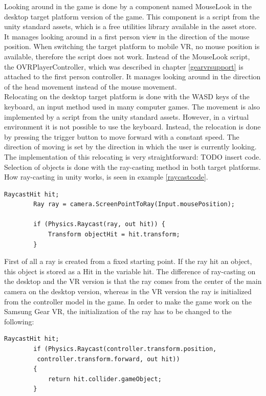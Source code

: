 Looking around in the game is done by a component named MouseLook in the desktop target platform version of the game. This component is a script from the unity standard assets, which is a free utilities library available in the asset store. It manages looking around in a first person view in the direction of the mouse position. When switching the target platform to mobile VR, no mouse position is available, therefore the script does not work. Instead of the MouseLook script, the OVRPlayerController, which was described in chapter \ref{gearvrsupport} is attached to the first person controller. It manages looking around in the direction of the head movement instead of the mouse movement.\\
Relocating on the desktop target platform is done with the WASD keys of the keyboard, an input method used in many computer games. The movement is also implemented by a script from the unity standard assets. However, in a virtual environment it is not possible to use the keyboard. Instead, the relocation is done by pressing the trigger button to move forward with a constant speed. The direction of moving is set by the direction in which the user is currently looking. The implementation of this relocating is very straightforward: TODO insert code.\\
Selection of objects is done with the ray-casting method in both target platforms. How ray-casting in unity works, is seen in example \ref{raycastcode}. 
\begin{lstlisting} 
RaycastHit hit;
        Ray ray = camera.ScreenPointToRay(Input.mousePosition);
        
        if (Physics.Raycast(ray, out hit)) {
            Transform objectHit = hit.transform;
        }
\end{lstlisting}
\label{raycastcode}
First of all a ray is created from a fixed starting point. If the ray hit an object, this object is stored as a Hit in the variable hit. The difference of ray-casting on the desktop and the VR version is that the ray comes from the center of the main camera on the desktop version, whereas in the VR version the ray is initialized from the controller model in the game. In order to make the game work on the Samsung Gear VR, the initialization of the ray has to be changed to the following:
\begin{lstlisting} 
RaycastHit hit;
        if (Physics.Raycast(controller.transform.position,
         controller.transform.forward, out hit))
        {
            return hit.collider.gameObject;
        }
\end{lstlisting}

